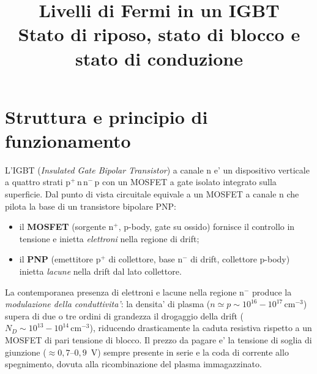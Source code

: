\documentclass[11pt,a4paper]{article}
\title{\bfseries Livelli di Fermi in un IGBT\\[2pt]
\large Stato di riposo, stato di blocco e stato di conduzione}
\author{}
\date{}
\begin{document}
\maketitle
\vspace{-2.2\baselineskip}

\section{Struttura e principio di funzionamento}

L'IGBT (\emph{Insulated Gate Bipolar Transistor}) a canale n e' un dispositivo
verticale a quattro strati $\mathrm{p^{+}\,n\,n^{-}\,p}$ con un MOSFET a gate
isolato integrato sulla superficie. Dal punto di vista circuitale equivale a un
MOSFET a canale n che pilota la base di un transistore bipolare PNP:

\begin{itemize}[nosep,leftmargin=1.4em]
  \item il \textbf{MOSFET} (sorgente $\mathrm{n^{+}}$, p-body, gate su ossido)
        fornisce il controllo in tensione e inietta \emph{elettroni} nella
        regione di drift;
  \item il \textbf{PNP} (emettitore $\mathrm{p^{+}}$ di collettore, base
        $\mathrm{n^{-}}$ di drift, collettore p-body) inietta \emph{lacune}
        nella drift dal lato collettore.
\end{itemize}

La contemporanea presenza di elettroni e lacune nella regione $\mathrm{n^{-}}$
produce la \emph{modulazione della conduttivita'}: la densita' di plasma
($n \simeq p \sim 10^{16}\!-\!10^{17}\,\mathrm{cm^{-3}}$) supera di due o tre
ordini di grandezza il drogaggio della drift
($N_D \sim 10^{13}\!-\!10^{14}\,\mathrm{cm^{-3}}$), riducendo drasticamente la
caduta resistiva rispetto a un MOSFET di pari tensione di blocco. Il prezzo da
pagare e' la tensione di soglia di giunzione ($\approx 0{,}7$--$0{,}9$~V) sempre
presente in serie e la coda di corrente allo spegnimento, dovuta alla
ricombinazione del plasma immagazzinato.
\end{document}
